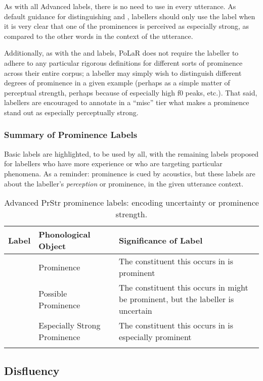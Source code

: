 As with all Advanced labels, there is no need to use \textlabel{**} in every utterance. As default guidance for distinguishing \textlabel{*} and \textlabel{**}, labellers should only use the \textlabel{**} label when it is very clear that one of the prominences is perceived as especially strong, as compared to the other words in the context of the utterance.

Additionally, as with the \textlabel{]} and \textlabel{]]} labels, PoLaR does not require the labeller to adhere to any particular rigorous definitions for different sorts of prominence across their entire corpus; a labeller may simply wish to distinguish different degrees of prominence in a given example (perhaps as a simple matter of perceptual strength, perhaps because of especially high f0 peaks, etc.). That said, labellers are encouraged to annotate in a “misc” tier what makes a \textlabel{**} prominence stand out as especially perceptually strong.

\subsubsection{Summary of Prominence Labels}\label{sec:summary-of-prominence-labels}

Basic labels are highlighted, to be used by all, with the remaining labels proposed for labellers who have more experience or who are targeting particular phenomena. As a reminder: prominence is cued by acoustics, but these labels are about the labeller’s \textit{perception} or prominence, in the given utterance context.

\begin{longtable}{clp{.5\linewidth}} \toprule \textbf{Label} & \textbf{Phonological Object} & \textbf{Significance of Label}\tabularnewline
\midrule \endhead
\rowcolor{green}
\textlabel{*} & Prominence & The constituent this occurs in is prominent\tabularnewline
\textlabel{?*} & Possible Prominence & The constituent this occurs in might be prominent, but the labeller is uncertain \tabularnewline
\textlabel{**} & Especially Strong Prominence & The constituent this occurs in is especially prominent \tabularnewline
%
\bottomrule
\caption{Advanced PrStr prominence labels: encoding uncertainty or prominence strength.}
\end{longtable}

\subsection{Disfluency}\label{sec:disfluency}

